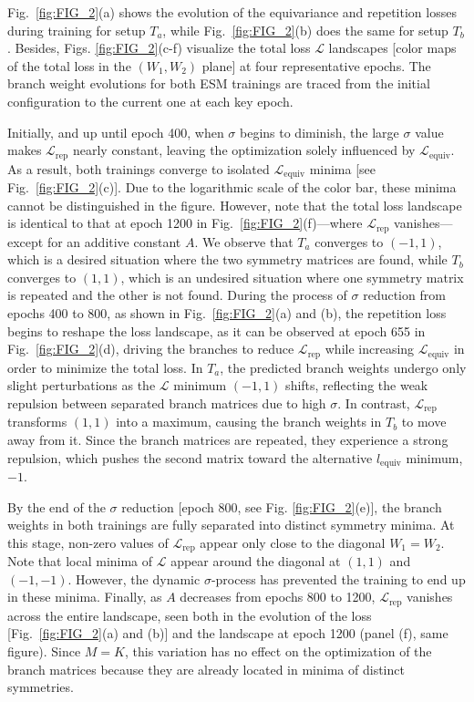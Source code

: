 Fig.~\ref{fig:FIG_2}(a) shows the evolution of the equivariance and repetition losses during training for setup $T_a$, while Fig.~\ref{fig:FIG_2}(b) does the same for setup $T_b$. Besides, Figs. \ref{fig:FIG_2}(c-f) visualize the total loss $\mathcal{L}$ landscapes [color maps of the total loss in the $(W_1, W_2)$ plane] at four representative epochs. The branch weight evolutions for both ESM trainings are traced from the initial configuration to the current one at each key epoch.


Initially, and up until epoch 400, when $\sigma$ begins to diminish, the large $\sigma$ value makes $\mathcal{L}_{\mathrm{rep}}$ nearly constant, leaving the optimization solely influenced by $\mathcal{L}_{\mathrm{equiv}}$. As a result, both trainings converge to isolated $\mathcal{L}_{\mathrm{equiv}}$ minima [see Fig.~\ref{fig:FIG_2}(c)]. Due to the logarithmic scale of the color bar, these minima cannot be distinguished in the figure. However, note that the total loss landscape is identical to that at epoch 1200 in Fig.~\ref{fig:FIG_2}(f)—where $\mathcal{L}_{\mathrm{rep}}$ vanishes—except for an additive constant $A$. We observe that $T_a$ converges to $(-1, 1)$, which is a desired situation where the two symmetry matrices are found, while $T_b$ converges to $(1, 1)$, which is an undesired situation where one symmetry matrix is repeated and the other is not found. During the process of $\sigma$ reduction from epochs 400 to 800, as shown in Fig.~\ref{fig:FIG_2}(a) and (b), the repetition loss begins to reshape the loss landscape, as it can be observed at epoch 655 in Fig.~\ref{fig:FIG_2}(d), driving the branches to reduce $\mathcal{L}_{\mathrm{rep}}$ while increasing $\mathcal{L}_{\mathrm{equiv}}$ in order to minimize the total loss. In $T_a$, the predicted branch weights undergo only slight perturbations as the $\mathcal{L}$ minimum $(-1,1)$ shifts, reflecting the weak repulsion between separated branch matrices due to high $\sigma$. In contrast, $\mathcal{L}_{\mathrm{rep}}$ transforms $(1,1)$ into a maximum, causing the branch weights in $T_b$ to move away from it. Since the branch matrices are repeated, they experience a strong repulsion, which pushes the second matrix toward the alternative $l_{\mathrm{equiv}}$ minimum, $-1$.

By the end of the $\sigma$ reduction [epoch 800, see Fig. \ref{fig:FIG_2}(e)], the branch weights in both trainings are fully separated into distinct symmetry minima. At this stage, non-zero values of $\mathcal{L}_{\mathrm{rep}}$ appear only close to the diagonal $W_1 = W_2$. Note that local minima of $\mathcal{L}$ appear around the diagonal at $(1,1)$ and $(-1,-1)$. However, the dynamic $\sigma$-process has prevented the training to end up in these minima. Finally, as $A$ decreases from epochs 800 to 1200, $\mathcal{L}_{\mathrm{rep}}$ vanishes across the entire landscape, seen both in the evolution of the loss [Fig.~\ref{fig:FIG_2}(a) and (b)] and the landscape at epoch 1200 (panel (f), same figure). Since $M = K$, this variation has no effect on the optimization of the branch matrices because they are already located in minima of distinct symmetries.


